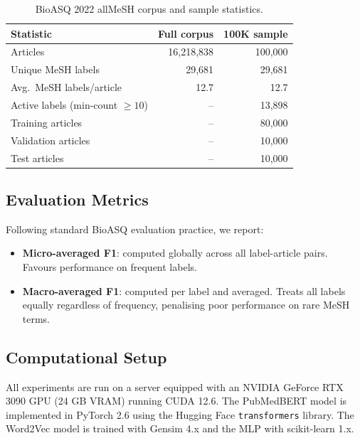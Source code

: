 \documentclass[sigconf]{acmart}
\begin{document}
\begin{table}[h]
\caption{BioASQ 2022 allMeSH corpus and sample statistics.}
\label{tab:dataset}
\begin{tabular}{lrr}
\toprule
\textbf{Statistic} & \textbf{Full corpus} & \textbf{100K sample} \\
\midrule
Articles                   & 16{,}218{,}838 & 100{,}000 \\
Unique MeSH labels         & 29{,}681       & 29{,}681  \\
Avg.\ MeSH labels/article  & 12.7           & 12.7      \\
Active labels (min-count $\geq10$) & --     & 13{,}898  \\
Training articles          & --             & 80{,}000  \\
Validation articles        & --             & 10{,}000  \\
Test articles              & --             & 10{,}000  \\
\bottomrule
\end{tabular}
\end{table}

\subsection{Evaluation Metrics}

Following standard BioASQ evaluation practice, we report:

\begin{itemize}
    \item \textbf{Micro-averaged F1}: computed globally across all label-article pairs.
    Favours performance on frequent labels.
    \item \textbf{Macro-averaged F1}: computed per label and averaged. Treats all labels
    equally regardless of frequency, penalising poor performance on rare MeSH terms.
\end{itemize}

\subsection{Computational Setup}

All experiments are run on a server equipped with an NVIDIA GeForce RTX 3090 GPU (24 GB VRAM)
running CUDA 12.6. The PubMedBERT model is implemented in PyTorch 2.6 using the Hugging Face
\texttt{transformers} library. The Word2Vec model is trained with Gensim 4.x and the MLP
with scikit-learn 1.x.
\end{document}
